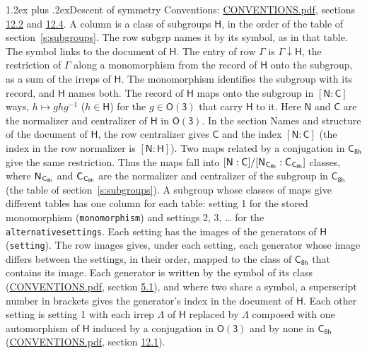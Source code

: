 \documentclass[10pt,a4paper]{article}
\makeatletter
\renewcommand\section{\@startsection{section}{1}{\z@}{-3ex plus -1ex minus -.2ex}%
  {1.2ex plus .2ex}{\normalfont\large\sffamily\bfseries\color{parttitle}}}
\numberwithin{equation}{section}
\newcommand{\grp}[1]{\mathsf{#1}}
\newcommand{\grpindex}[2]{[#1 : #2]}
\newcommand{\restr}[2]{#1\!\downarrow#2}
\newcommand{\hairsp}{\mkern1mu}
\makeatother
\begin{document}
\section{Descent of symmetry}\label{s:subduction}
Conventions: \href{../../CONVENTIONS.pdf}{CONVENTIONS.pdf}, sections \href{../../CONVENTIONS.pdf\#conv.12.2}{12.2} and \href{../../CONVENTIONS.pdf\#conv.12.4}{12.4}.
A column is a class of subgroups $\grp{H}$, in the order of the table of section~\ref{s:subgroups}. The row subgrp names it by its symbol, as in that table. The symbol links to the document of $\grp{H}$. The entry of row $\Gamma$ is $\restr{\Gamma}{\grp{H}}$, the restriction of $\Gamma$ along a monomorphism from the record of $\grp{H}$ onto the subgroup, as a sum of the irreps of $\grp{H}$. The monomorphism identifies the subgroup with its record, and $\grp{H}$ names both. \label{n:group.normalizer.o3}\label{n:group.centralizer.o3}The record of $\grp{H}$ maps onto the subgroup in $\grpindex{\grp{N}}{\grp{C}}$ ways, $h \mapsto g h g^{-1}$ ($h \in \grp{H}$) for the $g \in \grp{O(3)}$ that carry $\grp{H}$ to it. Here $\grp{N}$ and $\grp{C}$ are the normalizer and centralizer of $\grp{H}$ in \href{O3.pdf}{$\grp{O(3)}$}. In the section Names and structure of the document of $\grp{H}$, the row centralizer gives $\grp{C}$ and the index $\grpindex{\grp{N}}{\grp{C}}$ (the index in the row normalizer is $\grpindex{\grp{N}}{\grp{H}}$). Two maps related by a conjugation in $\grp{C_{8h}}$ give the same restriction. Thus the maps fall into $\grpindex{\grp{N}}{\grp{C}}/\grpindex{\grp{N}_{\hairsp \grp{C_{8h}}}}{\grp{C}_{\hairsp \grp{C_{8h}}}}$ classes, where $\grp{N}_{\hairsp \grp{C_{8h}}}$ and $\grp{C}_{\hairsp \grp{C_{8h}}}$ are the normalizer and centralizer of the subgroup in $\grp{C_{8h}}$ (the table of section~\ref{s:subgroups}). \label{n:head.setting}A subgroup whose classes of maps give different tables has one column for each table: setting 1 for the stored monomorphism (\texttt{monomorphism}) and settings 2, 3, \dots{} for the \texttt{alternativesettings}. Each setting has the images of the generators of $\grp{H}$ (\texttt{setting}). \label{n:head.images}The row images gives, under each setting, each generator whose image differs between the settings, in their order, mapped to the class of $\grp{C_{8h}}$ that contains its image. Each generator is written by the symbol of its class (\href{../../CONVENTIONS.pdf}{CONVENTIONS.pdf}, section \href{../../CONVENTIONS.pdf\#conv.5.1}{5.1}), and where two share a symbol, a superscript number in brackets gives the generator's index in the document of $\grp{H}$. \label{n:irrep.Delta}Each other setting is setting 1 with each irrep $\Lambda$ of $\grp{H}$ replaced by $\Lambda$ composed with one automorphism of $\grp{H}$ induced by a conjugation in \href{O3.pdf}{$\grp{O(3)}$} and by none in $\grp{C_{8h}}$ (\href{../../CONVENTIONS.pdf}{CONVENTIONS.pdf}, section \href{../../CONVENTIONS.pdf\#conv.12.1}{12.1}).
\end{document}
